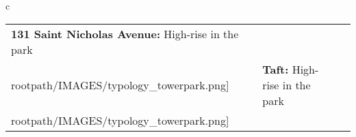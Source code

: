 \begin{table}[H]
        \begin{tabular}{c}
        \begin{tabular}{m{1.25in} m{2in} m{.1in} m{1.25in} m{2in}}
\textbf{131 Saint Nicholas Avenue:} {High-rise in the park} & \texttt{[image: \\rootpath/IMAGES/typology\_towerpark.png]} & & \textbf{Taft:} {High-rise in the park} & \texttt{[image: \\rootpath/IMAGES/typology\_towerpark.png]}
\end{tabular}\end{tabular}
        \end{table}